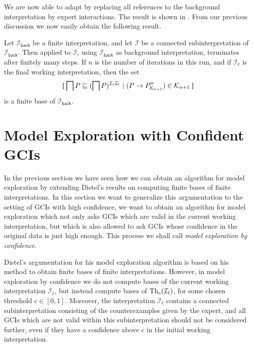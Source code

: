We are now able to adapt  by replacing all references to
the background interpretation by expert interactions.  The result is shown in
.  From our previous discussion we now easily obtain the
following result.

\begin{Theorem}
  \label{thm:Felix-6.16}
  Let $\mathcal{I}_{\mathsf{back}}$ be a finite interpretation, and let $\mathcal{I}$ be a
  connected subinterpretation of $\mathcal{I}_{\mathsf{back}}$.  Then
   applied to $\mathcal{I}$, using
  $\mathcal{I}_{\mathsf{back}}$ as background interpretation, terminates after finitely
  many steps.  If $n$ is the number of iterations in this run, and if $\mathcal{I}_{\ell}$
  is the final working interpretation, then the set
  \begin{equation*}
    {\ensuremath{\{\, \bigsqcap P \sqsubseteq (\bigsqcap P)^{\mathcal{I}_{\ell}\mathcal{I}_{\ell}}
      \mid (P \to P_{{\mathbb{K}}_{n+1}}'') \in \mathcal{K}_{n+1} \,\}}}
  \end{equation*}
  is a finite base of $\mathcal{I}_{\mathsf{back}}$.
\end{Theorem}

\section{Model Exploration with Confident GCIs}
\label{sec:model-expl-with-1}

In the previous section we have seen how we can obtain an algorithm for model exploration
by extending Distel's results on computing finite bases of finite interpretations.  In
this section we want to generalize this argumentation to the setting of GCIs with high
confidence, \ie we want to obtain an algorithm for model exploration which not only asks
GCIs which are valid in the current working interpretation, but which is also allowed to
ask GCIs whose confidence in the original data is just high enough.  This process we shall
call \emph{model exploration by confidence}.

Distel's argumentation for his model exploration algorithm is based on his method to
obtain finite bases of finite interpretations.  However, in model exploration by
confidence we do not compute bases of the current working interpretation
$\mathcal{I}_{\ell}$, but instead compute bases of $\operatorname{Th}_{c}(\mathcal{I}_{\ell})$, for some
chosen threshold $c \in [0,1]$.  Moreover, the interpretation $\mathcal{I}_{\ell}$
contains a connected subinterpretation consisting of the counterexamples given by the
expert, and all GCIs which are not valid within this subinterpretation should not be
considered further, even if they have a confidence above $c$ in the initial working
interpretation.

